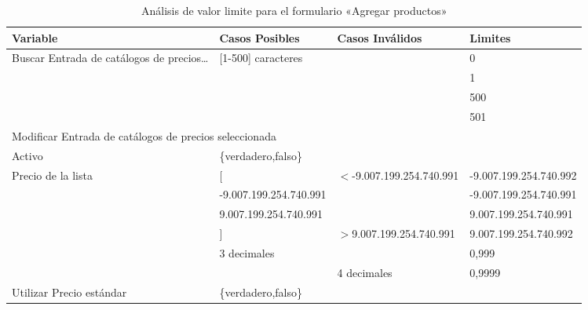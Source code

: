 \begin{table}
\centering
\begin{tabular}{|p{3.0cm}|p{4.0cm}|p{4.0cm}|l|}
\hline
\footnotesize{\textbf{Variable}} & \footnotesize{\textbf{Casos Posibles}} & \footnotesize{\textbf{Casos Inválidos}} & \footnotesize{\textbf{Limites}} \\
\hline
\footnotesize{Buscar Entrada de catálogos de precios\ldots} & \footnotesize{[1-500] caracteres} & & \footnotesize{0} \\
& & & \footnotesize{1} \\
& & & \footnotesize{500} \\
& & & \footnotesize{501} \\
\hline
\multicolumn{4}{|l|}{\footnotesize{Modificar Entrada de catálogos de precios seleccionada}} \\
\hline
\footnotesize{Activo} & \footnotesize{\{verdadero,falso\}} & & \\
\hline
\footnotesize{Precio de la lista} & \footnotesize{[} & \footnotesize{$<$-9.007.199.254.740.991} & \footnotesize{-9.007.199.254.740.992} \\
& \footnotesize{-9.007.199.254.740.991} & & \footnotesize{-9.007.199.254.740.991} \\
& \footnotesize{9.007.199.254.740.991} & & \footnotesize{9.007.199.254.740.991} \\
& \footnotesize{]} & \footnotesize{$>$9.007.199.254.740.991} & \footnotesize{9.007.199.254.740.992} \\
& \footnotesize{3 decimales} & & \footnotesize{0,999} \\
& & \footnotesize{4 decimales} & \footnotesize{0,9999} \\
\hline
\footnotesize{Utilizar Precio estándar} & \footnotesize{\{verdadero,falso\}} & & \\
\hline
\end{tabular}
\caption{Análisis de valor limite para el formulario «Agregar productos»}
\label{myers_06}
\end{table}


